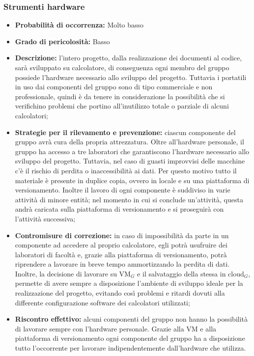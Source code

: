 \subsubsection{Strumenti hardware}
\hypertarget{subsubsect:hardware}{}
\begin{itemize}
\item \textbf{Probabilità di occorrenza:} Molto basso
\item \textbf{Grado di pericolosità:} Basso

\item \textbf{Descrizione:} l'intero progetto, dalla realizzazione dei documenti al codice, sarà sviluppato su calcolatore, di conseguenza ogni membro del gruppo possiede l'hardware necessario allo sviluppo del progetto. Tuttavia i portatili in uso dai componenti del gruppo sono di tipo commerciale e non professionale, quindi è da tenere in considerazione la possibilità che si verifichino problemi che portino all'inutilizzo totale o parziale di alcuni calcolatori;

\item \textbf{Strategie per il rilevamento e prevenzione:} ciascun componente del gruppo avrà cura della propria attrezzatura. Oltre all'hardware personale, il gruppo ha accesso a tre laboratori che garantiscono l'hardware necessario allo sviluppo del progetto. Tuttavia, nel caso di guasti improvvisi delle macchine c'è il rischio di perdita o inaccessibilità ai dati. Per questo motivo tutto il materiale è presente in duplice copia, ovvero in locale e su una piattaforma di versionamento. Inoltre il lavoro di ogni componente è suddiviso in varie attività di minore entità; nel momento in cui si conclude un'attività, questa andrà caricata sulla piattaforma di versionamento e si proseguirà con l'attività successiva;
 
\item \textbf{Contromisure di correzione:} in caso di impossibilità da parte in un componente ad accedere al proprio calcolatore, egli potrà usufruire dei laboratori di facoltà e, grazie alla piattaforma di versionamento, potrà riprendere a lavorare in breve tempo ammortizzando la perdita di dati. Inoltre, la decisione di lavorare su VM$_G$ e il salvataggio della stessa in cloud$_G$, permette di avere sempre a disposizione l'ambiente di sviluppo ideale per la realizzazione del progetto, evitando così problemi e ritardi dovuti alla differente configurazione software dei calcolatori utilizzati;

\item \textbf{Riscontro effettivo:} alcuni componenti del gruppo non hanno la possibilità di lavorare sempre con l'hardware personale. Grazie alla VM e alla piattaforma di versionamento ogni componente del gruppo ha a disposizione tutto l'occorrente per lavorare indipendentemente dall'hardware che utilizza.
\end{itemize}

